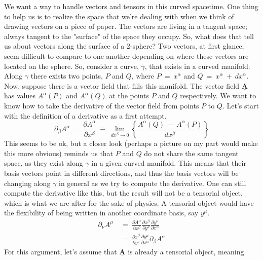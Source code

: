 \hskip 25pt We want a way to handle vectors and tensors in this curved spacetime.  One thing to help us is to realize
the space that we're dealing with when we think of drawing vectors on a piece of paper.  The vectors are living in a
tangent space; always tangent to the "surface" of the space they occupy.  So, what does that tell us about vectors along
the surface of a 2-sphere?  Two vectors, at first glance, seem difficult to compare to one another depending on where these
vectors are located on the sphere.  So, consider a curve, $\gamma$, that exists in a curved manifold.  Along
$\gamma$ there exists two points, $P$ and $Q$, where $P\ =\ x^{\alpha}$ and $Q\ =\ x^{\alpha}\ +\ dx^{\alpha}$.  Now,
suppose there is a vector field that fills this manifold.  The vector field $\mathbf{\underline{A}}$ has values
$A^{\alpha}(P)$ and $A^{\alpha}(Q)$ at the points $P$ and $Q$ respectively.  We want to know how to take the derivative
of the vector field from points $P$ to $Q$.  Let's start with the definition of a derivative as a first attempt.
\begin{equation}
  \partial_{\beta}A^{\alpha}\ =\ \frac{\partial A^{\alpha}}{\partial x^{\beta}}\ \equiv\
  \lim_{dx^{\beta}\rightarrow0}\left\{\frac{A^{\alpha}(Q)\ -\ A^{\alpha}(P)}{dx^{\beta}}\right\}
\end{equation}
This seems to be ok, but a closer look (perhaps a picture on my part would make this more obvious) reminds us that
$P$ and $Q$ do not share the same tangent space, as they exist along $\gamma$ in a given curved manifold.  This means that
their basis vectors point in different directions, and thus the basis vectors will be changing along $\gamma$ in general
as we try to compute the derivative.  One can still compute the derivative like this, but the result will not be a
tensorial object, which is what we are after for the sake of physics.  A tensorial object would have the flexibility
of being written in another coordinate basis, say $y^{\mu}$.
\begin{equation}
  \begin{aligned}
    \partial_{\nu}A^{\mu}\ &=\ 
    \frac{\partial A^{\alpha}}{\partial x^{\beta}}
    \frac{\partial x^{\beta}}{\partial y^{\nu}}\frac{\partial y^{\mu}}{\partial x^{\alpha}} \\
    &=\ \frac{\partial x^{\beta}}{\partial y^{\nu}}\frac{\partial y^{\mu}}{\partial x^{\alpha}}\partial_{\beta}A^{\alpha}
  \end{aligned}
  \label{eq:transform}
\end{equation}
For this argument, let's assume that $\mathbf{\underline{A}}$ is already a tensorial object, meaning

